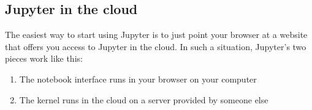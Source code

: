 \documentclass[letterpaper,10pt,english]{sphinxmanual}
\begin{document}
\subsection{Jupyter in the cloud}
\label{\detokenize{chapter-3-jupyter:jupyter-in-the-cloud}}
The easiest way to start using Jupyter is to just point your browser at a website that offers you access to Jupyter in the cloud.  In such a situation, Jupyter’s two pieces work like this:
\begin{enumerate}
%
\item {} 
The notebook interface runs in your browser on your computer

\item {} 
The kernel runs in the cloud on a server provided by someone else

\end{enumerate}
\end{document}
